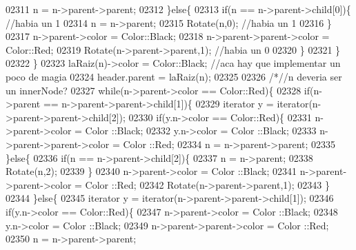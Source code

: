 \begin{DoxyCode}
02311                     n = n->parent->parent;
02312                 \}\textcolor{keywordflow}{else}\{
02313                     \textcolor{keywordflow}{if}(n == n->parent->child[0])\{ \textcolor{comment}{//habia un 1}
02314                         n = n->parent;
02315                         Rotate(n,0); \textcolor{comment}{//habia un 1}
02316                     \}
02317                     n->parent->color = Color::Black;
02318                     n->parent->parent->color = Color::Red;
02319                     Rotate(n->parent->parent,1); \textcolor{comment}{//habia un 0}
02320                 \}
02321             \}
02322         \}
02323         laRaiz(n)->color = Color::Black;       \textcolor{comment}{//aca hay que implementar un poco de magia}
02324         header.parent = laRaiz(n);
02325 
02326         \textcolor{comment}{/*//n deveria ser un innerNode?}
02327 \textcolor{comment}{        while(n->parent->color == Color::Red)\{}
02328 \textcolor{comment}{            if(n->parent == n->parent->parent->child[1])\{}
02329 \textcolor{comment}{                iterator y = iterator(n->parent->parent->child[2]);}
02330 \textcolor{comment}{                if(y.n->color == Color::Red)\{}
02331 \textcolor{comment}{                    n->parent->color = Color ::Black;}
02332 \textcolor{comment}{                    y.n->color = Color ::Black;}
02333 \textcolor{comment}{                    n->parent->parent->color = Color ::Red;}
02334 \textcolor{comment}{                    n = n->parent->parent;}
02335 \textcolor{comment}{                \}else\{}
02336 \textcolor{comment}{                    if(n == n->parent->child[2])\{}
02337 \textcolor{comment}{                        n = n->parent;}
02338 \textcolor{comment}{                        Rotate(n,2);}
02339 \textcolor{comment}{                    \}}
02340 \textcolor{comment}{                    n->parent->color = Color ::Black;}
02341 \textcolor{comment}{                    n->parent->parent->color = Color ::Red;}
02342 \textcolor{comment}{                    Rotate(n->parent->parent,1);}
02343 \textcolor{comment}{                \}}
02344 \textcolor{comment}{            \}else\{}
02345 \textcolor{comment}{                iterator y = iterator(n->parent->parent->child[1]);}
02346 \textcolor{comment}{                if(y.n->color == Color::Red)\{}
02347 \textcolor{comment}{                    n->parent->color = Color ::Black;}
02348 \textcolor{comment}{                    y.n->color = Color ::Black;}
02349 \textcolor{comment}{                    n->parent->parent->color = Color ::Red;}
02350 \textcolor{comment}{                    n = n->parent->parent;}

\end{DoxyCode}
